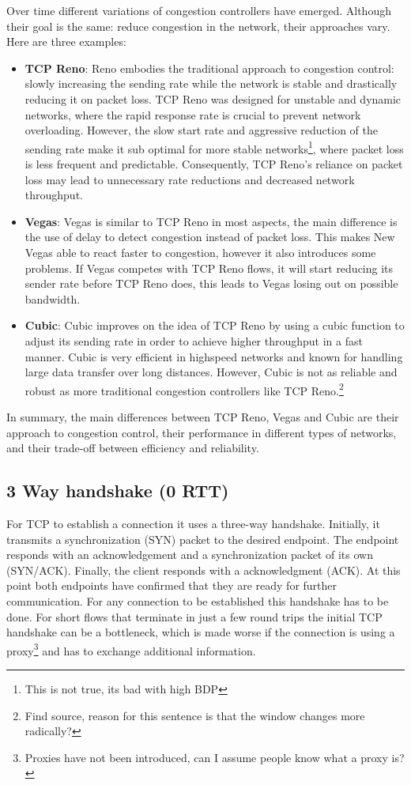 \documentclass[a4paper,english, 11pt]{report}
\begin{document}
Over time different variations of congestion controllers have emerged. Although their goal is the same: reduce congestion in the network, their approaches vary. Here are three examples:

\begin{itemize}
  \item \textbf{TCP Reno}: Reno embodies the traditional approach to congestion control: slowly increasing the sending rate while the network is stable and drastically reducing it on packet loss. TCP Reno was designed for unstable and dynamic networks, where the rapid response rate is crucial to prevent network overloading. However, the slow start rate and aggressive reduction of the sending rate make it sub optimal for more stable networks\footnote{This is not true, its bad with high BDP}, where packet loss is less frequent and predictable. Consequently, TCP Reno's reliance on packet loss may lead to unnecessary rate reductions and decreased network throughput.
  \item \textbf{Vegas}: Vegas is similar to TCP Reno in most aspects, the main difference is the use of delay to detect congestion instead of packet loss. This makes New Vegas able to react faster to congestion, however it also introduces some problems. If Vegas competes with TCP Reno flows, it will start reducing its sender rate before TCP Reno does, this leads to Vegas losing out on possible bandwidth. 
  \item \textbf{Cubic}: Cubic improves on the idea of TCP Reno by using a cubic function to adjust its sending rate in order to achieve higher throughput in a fast manner. Cubic is very efficient in highspeed networks and known for handling large data transfer over long distances. However, Cubic is not as reliable and robust as more traditional congestion controllers like TCP Reno.\footnote{Find source, reason for this sentence is that the window changes  more radically?}
\end{itemize}

In summary, the main differences between TCP Reno, Vegas and Cubic are their approach to congestion control, their performance in different types of networks, and their trade-off between efficiency and reliability.

\subsection{3 Way handshake (0 RTT)}
For TCP to establish a connection it uses a three-way handshake. Initially, it transmits a synchronization (SYN) packet to the desired endpoint. The endpoint responds with an acknowledgement and a synchronization packet of its own (SYN/ACK). Finally, the client responds with a acknowledgment (ACK). At this point both endpoints have confirmed that they are ready for further communication. For any connection to be established this handshake has to be done. For short flows that terminate in just a few round trips the initial TCP handshake can be a bottleneck, which is made worse if the connection is using a proxy\footnote{Proxies have not been introduced, can I assume people know what a proxy is?} and has to exchange additional information. 
\end{document}
